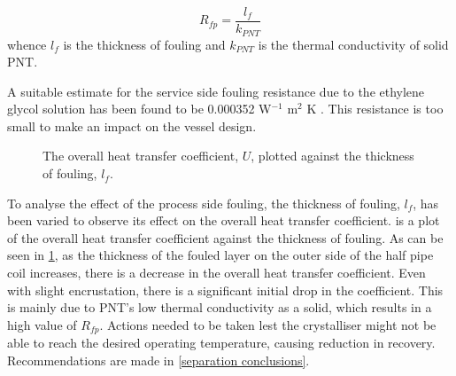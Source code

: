 \begin{equation} \label{eq:fouling}
    R_{fp} = \frac{l_f}{k_{PNT}}
\end{equation}
whence $l_f$ is the thickness of fouling and $k_{PNT}$ is the thermal conductivity of solid PNT. 

A suitable estimate for the service side fouling resistance due to the ethylene glycol solution has been found to be 0.000352 W$^{-1}$ m$^2$ K \cite{noauthor_fouling_2021}. This resistance is too small to make an impact on the vessel design. 

\begin{figure}
    \centering
    
    \caption{The overall heat transfer coefficient, $U$, plotted against the thickness of fouling, $l_f$.}
    \label{fig:fouling sensitivity}
\end{figure}


To analyse the effect of the process side fouling, the thickness of fouling, $l_f$, has been varied to observe its effect on the overall heat transfer coefficient.  is a plot of the overall heat transfer coefficient against the thickness of fouling. As can be seen in \cref{fig:fouling sensitivity}, as the thickness of the fouled layer on the outer side of the half pipe coil increases, there is a decrease in the overall heat transfer coefficient. Even with slight encrustation, there is a significant initial drop in the coefficient. This is mainly due to PNT's low thermal conductivity as a solid, which results in a high value of $R_{fp}$. Actions needed to be taken lest the crystalliser might not be able to reach the desired operating temperature, causing reduction in recovery. Recommendations are made in \cref{separation conclusions}.


